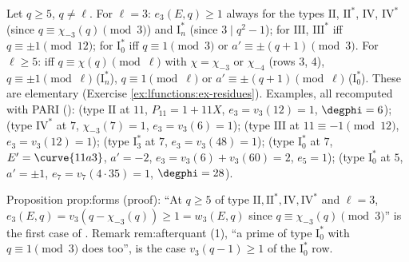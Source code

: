 \begin{remark}\label{rem:lfunctions:euler-values}
Let $q\ge5$, $q\ne\ell$. For $\ell=3$: $e_3(E,q)\ge1$ always for the types $\mathrm{II}$, $\mathrm{II}^*$, $\mathrm{IV}$, $\mathrm{IV}^*$ (since $q\equiv\chi_{-3}(q)\pmod3$) and $\mathrm I_n^*$ (since
$3\mid q^2-1$); for $\mathrm{III}$, $\mathrm{III}^*$ iff $q\equiv\pm1\pmod{12}$; for $\mathrm I_0^*$ iff $q\equiv1\pmod3$ or $a'\equiv\pm(q+1)\pmod3$. For $\ell\ge5$: iff $q\equiv\chi(q)\pmod\ell$ with
$\chi=\chi_{-3}$ or $\chi_{-4}$ (rows 3, 4), $q\equiv\pm1\pmod\ell$ ($\mathrm I_n^*$), $q\equiv1\pmod\ell$ or $a'\equiv\pm(q+1)\pmod\ell$ ($\mathrm I_0^*$). These are elementary (Exercise
\ref{ex:lfunctions:ex-residues}). Examples, all recomputed with PARI ():  (type $\mathrm{II}$ at $11$, $P_{11}=1+11X$, $e_3=v_3(12)=1$,
$\degphi=6$);  (type $\mathrm{IV}^*$ at $7$, $\chi_{-3}(7)=1$, $e_3=v_3(6)=1$);  (type $\mathrm{III}$ at $11\equiv-1\pmod{12}$, $e_3=v_3(12)=1$);  (type $\mathrm I_3^*$
at $7$, $e_3=v_3(48)=1$);  (type $\mathrm I_0^*$ at $7$, $E'=\curve{11a3}$, $a'=-2$, $e_3=v_3(6)+v_3(60)=2$, $e_5=1$);  (type $\mathrm I_0^*$ at $5$, $a'=\pm1$,
$e_7=v_7(4\cdot35)=1$, $\degphi=28$).
\end{remark}

\begin{paperlink}
Proposition prop:forms (proof): ``At $q\ge5$ of type $\mathrm{II},\mathrm{II}^*,\mathrm{IV},\mathrm{IV}^*$ and $\ell=3$, $e_3(E,q)=v_3(q-\chi_{-3}(q))\ge1=w_3(E,q)$ since $q\equiv\chi_{-3}(q)\pmod3$'' is the
first case of . Remark rem:afterquant (1), ``a prime of type $\mathrm I_0^*$ with $q\equiv1\pmod3$ does too'', is the case $v_3(q-1)\ge1$ of the
$\mathrm I_0^*$ row.
\end{paperlink}

